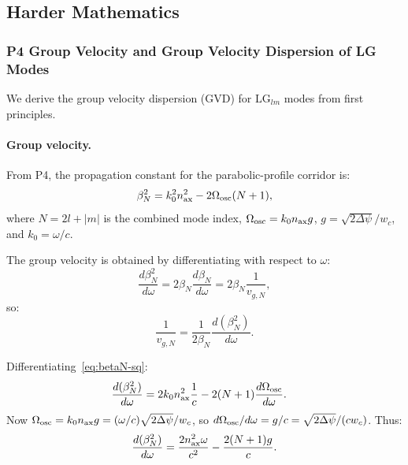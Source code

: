 \documentclass[aps,prd,twocolumn,superscriptaddress,nofootinbib]{revtex4-2}
\newcommand{\LG}{\mathrm{LG}}
\begin{document}
\subsection{Harder Mathematics}
\label{sec:hardmath}

\subsubsection{P4 Group Velocity and Group Velocity Dispersion of LG Modes}
\label{sec:gvd}

We derive the group velocity dispersion (GVD) for $\LG_{lm}$ modes from
first principles.

\paragraph{Group velocity.}
From P4, the propagation constant for the parabolic-profile corridor is:
\begin{equation}
\beta_N^2 = k_0^2 n_{\rm ax}^2 - 2\Omega_{\rm osc}(N+1),
\label{eq:betaN-sq}
\end{equation}
where $N = 2l + |m|$ is the combined mode index,
$\Omega_{\rm osc} = k_0 n_{\rm ax} g$,
$g = \sqrt{2\Delta\psi}/w_c$, and $k_0 = \omega/c$.

The group velocity is obtained by differentiating with respect to $\omega$:
\begin{equation}
\frac{d\beta_N^2}{d\omega} = 2\beta_N\frac{d\beta_N}{d\omega} = 2\beta_N\frac{1}{v_{g,N}},
\end{equation}
so:
\begin{equation}
\frac{1}{v_{g,N}} = \frac{1}{2\beta_N}\frac{d(\beta_N^2)}{d\omega}.
\end{equation}

Differentiating~\eqref{eq:betaN-sq}:
\begin{align}
\frac{d(\beta_N^2)}{d\omega}
&= 2k_0 n_{\rm ax}^2 \frac{1}{c}
- 2(N+1)\frac{d\Omega_{\rm osc}}{d\omega}.
\label{eq:dbetasq}
\end{align}
Now $\Omega_{\rm osc} = k_0 n_{\rm ax} g = (\omega/c)\sqrt{2\Delta\psi}/w_c$,
so $d\Omega_{\rm osc}/d\omega = g/c = \sqrt{2\Delta\psi}/(cw_c)$.  Thus:
\begin{equation}
\frac{d(\beta_N^2)}{d\omega}
= \frac{2n_{\rm ax}^2\omega}{c^2}
- \frac{2(N+1)g}{c}.
\end{equation}
\end{document}

